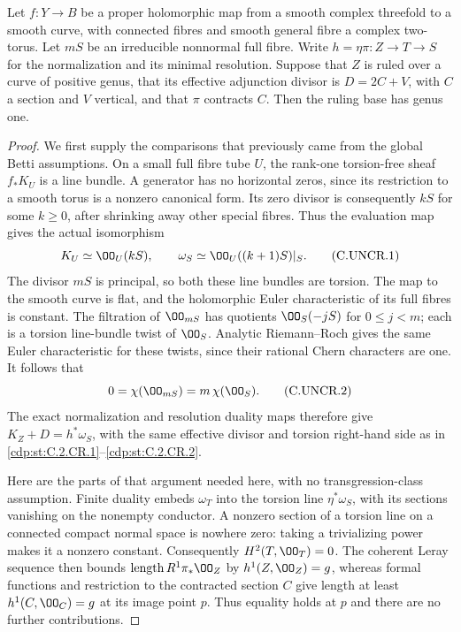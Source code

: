 
\begin{proposition}\label{cdp:st:C.2.UN.10}
Let $f:Y\to B$ be a proper holomorphic map from a
smooth complex threefold to a smooth curve, with
connected fibres and smooth general fibre a complex
two-torus. Let $mS$ be an irreducible nonnormal full
fibre. Write $h=\eta\pi:Z\to T\to S$ for the
normalization and its minimal resolution. Suppose
that $Z$ is ruled over a curve of positive genus,
that its effective adjunction divisor is
$D=2C+V$, with $C$ a section and $V$ vertical,
and that $\pi$ contracts $C$. Then the ruling
base has genus one.
\end{proposition}
\begin{proof}
We first supply the comparisons that previously
came from the global Betti assumptions. On a
small full fibre tube $U$, the rank-one torsion-free
sheaf $f_*K_U$ is a line bundle. A generator has
no horizontal zeros, since its restriction to a
smooth torus is a nonzero canonical form. Its
zero divisor is consequently $kS$ for some
$k\ge0$, after shrinking away other special
fibres. Thus the evaluation map gives the actual
isomorphism
\[
 K_U\simeq\OO_U(kS),\qquad
 \omega_S\simeq\OO_U((k+1)S)|_S.                \tag{C.UNCR.1}\label{cdp:eq:C.UNCR.1}
\]
The divisor $mS$ is principal, so both these line
bundles are torsion. The map to the smooth curve
is flat, and the holomorphic Euler characteristic
of its full fibres is constant. The filtration
of $\OO_{mS}$ has quotients
$\OO_S(-jS)$ for $0\le j<m$; each is a torsion
line-bundle twist of $\OO_S$. Analytic
Riemann--Roch gives the same Euler characteristic
for these twists, since their rational Chern
characters are one. It follows that
\[
            0=\chi(\OO_{mS})=m\,\chi(\OO_S).
 \tag{C.UNCR.2}\label{cdp:eq:C.UNCR.2}
\]
The exact normalization and resolution duality
maps therefore give $K_Z+D=h^*\omega_S$, with
the same effective divisor and torsion right-hand
side as in \ref{cdp:st:C.2.CR.1}--\ref{cdp:st:C.2.CR.2}.

Here are the parts of that argument needed here,
with no transgression-class assumption. Finite
duality embeds $\omega_T$ into the torsion line
$\eta^*\omega_S$, with its sections vanishing on
the nonempty conductor. A nonzero section of a
torsion line on a connected compact normal space
is nowhere zero: taking a trivializing power
makes it a nonzero constant. Consequently
$H^2(T,\OO_T)=0$. The coherent Leray sequence
then bounds $\operatorname{length}R^1\pi_*\OO_Z$
by $h^1(Z,\OO_Z)=g$, whereas formal functions
and restriction to the contracted section $C$
give length at least $h^1(C,\OO_C)=g$ at its
image point $p$. Thus equality holds at $p$ and
there are no further contributions.


\end{proof}

